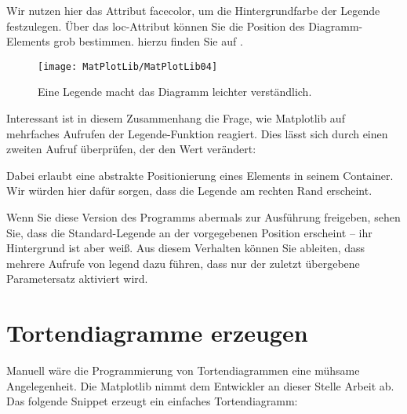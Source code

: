 

\medskip

Wir nutzen hier das Attribut facecolor, um die Hintergrundfarbe der Legende festzulegen. Über das loc-Attribut können Sie die Position des Diagramm-Elements grob bestimmen.  hierzu finden Sie auf .

\begin{figure}
  \begin{center}  
    \texttt{[image: MatPlotLib/MatPlotLib04]}      
        
    \caption{Eine Legende macht das Diagramm leichter verständlich.}\label{Matplotlib04}
  \end{center}    
\end{figure}


Interessant ist in diesem Zusammenhang die Frage, wie Matplotlib auf mehrfaches Aufrufen der Legende-Funktion reagiert. Dies lässt sich durch einen zweiten Aufruf überprüfen, der den Wert  verändert:

\medskip




\medskip

Dabei erlaubt  eine abstrakte Positionierung eines Elements in seinem Container. Wir würden hier dafür sorgen, dass die Legende am rechten Rand erscheint.

Wenn Sie diese Version des Programms abermals zur Ausführung freigeben, sehen Sie, dass die Standard-Legende an der vorgegebenen Position erscheint – ihr Hintergrund ist aber weiß. Aus diesem Verhalten können Sie ableiten, dass mehrere Aufrufe von legend dazu führen, dass nur der zuletzt übergebene Parametersatz aktiviert wird.

\section{Tortendiagramme erzeugen}

Manuell wäre die Programmierung von Tortendiagrammen eine mühsame Angelegenheit. Die Matplotlib nimmt dem Entwickler an dieser Stelle Arbeit ab. Das folgende Snippet erzeugt ein einfaches Tortendiagramm:


